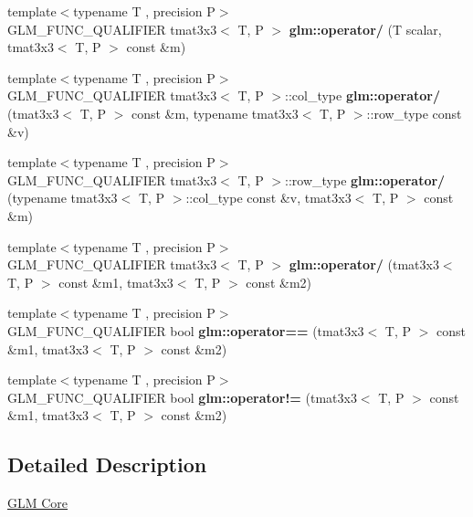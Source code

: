 \begin{DoxyCompactItemize}
\mbox{\label{type__mat3x3_8inl_a7a1b2a5332cd70c694c6a0dd64485325}} 
{\footnotesize template$<$typename T , precision P$>$ }\\G\+L\+M\+\_\+\+F\+U\+N\+C\+\_\+\+Q\+U\+A\+L\+I\+F\+I\+ER tmat3x3$<$ T, P $>$ {\bfseries glm\+::operator/} (T scalar, tmat3x3$<$ T, P $>$ const \&m)
\item 
\mbox{\label{type__mat3x3_8inl_ae0b7424ac335fe54c985e67c531176c0}} 
{\footnotesize template$<$typename T , precision P$>$ }\\G\+L\+M\+\_\+\+F\+U\+N\+C\+\_\+\+Q\+U\+A\+L\+I\+F\+I\+ER tmat3x3$<$ T, P $>$\+::col\+\_\+type {\bfseries glm\+::operator/} (tmat3x3$<$ T, P $>$ const \&m, typename tmat3x3$<$ T, P $>$\+::row\+\_\+type const \&v)
\item 
\mbox{\label{type__mat3x3_8inl_a8c3f939040ea3ca3707ce7d0b36b9b91}} 
{\footnotesize template$<$typename T , precision P$>$ }\\G\+L\+M\+\_\+\+F\+U\+N\+C\+\_\+\+Q\+U\+A\+L\+I\+F\+I\+ER tmat3x3$<$ T, P $>$\+::row\+\_\+type {\bfseries glm\+::operator/} (typename tmat3x3$<$ T, P $>$\+::col\+\_\+type const \&v, tmat3x3$<$ T, P $>$ const \&m)
\item 
\mbox{\label{type__mat3x3_8inl_a5671c0e99b001cb443a8f05a62985ccf}} 
{\footnotesize template$<$typename T , precision P$>$ }\\G\+L\+M\+\_\+\+F\+U\+N\+C\+\_\+\+Q\+U\+A\+L\+I\+F\+I\+ER tmat3x3$<$ T, P $>$ {\bfseries glm\+::operator/} (tmat3x3$<$ T, P $>$ const \&m1, tmat3x3$<$ T, P $>$ const \&m2)
\item 
\mbox{\label{type__mat3x3_8inl_aaa61456c0ed2eed3acbf27b2ab797dee}} 
{\footnotesize template$<$typename T , precision P$>$ }\\G\+L\+M\+\_\+\+F\+U\+N\+C\+\_\+\+Q\+U\+A\+L\+I\+F\+I\+ER bool {\bfseries glm\+::operator==} (tmat3x3$<$ T, P $>$ const \&m1, tmat3x3$<$ T, P $>$ const \&m2)
\item 
\mbox{\label{type__mat3x3_8inl_a14702a5f8ce75f873a43422e77b5c818}} 
{\footnotesize template$<$typename T , precision P$>$ }\\G\+L\+M\+\_\+\+F\+U\+N\+C\+\_\+\+Q\+U\+A\+L\+I\+F\+I\+ER bool {\bfseries glm\+::operator!=} (tmat3x3$<$ T, P $>$ const \&m1, tmat3x3$<$ T, P $>$ const \&m2)
\end{DoxyCompactItemize}


\subsection{Detailed Description}
\hyperlink{group__core}{G\+LM Core} 